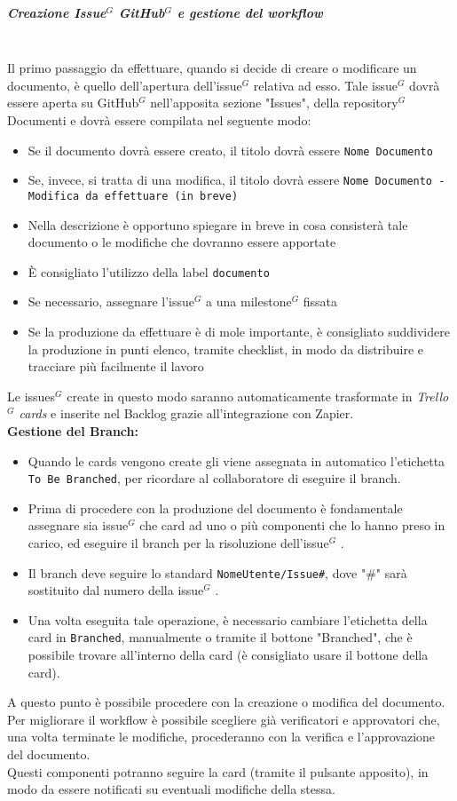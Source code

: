 \subparagraph{Creazione Issue$^G$  GitHub$^G$  e gestione del workflow}
\mbox{}\\
Il primo passaggio da effettuare, quando si decide di creare o modificare un documento, è quello dell'apertura dell'issue$^G$  relativa ad esso.
Tale issue$^G$ dovrà essere aperta su GitHub$^G$  nell'apposita sezione "Issues", della repository$^G$  Documenti e dovrà essere compilata nel seguente modo:
\begin{itemize}
    \item Se il documento dovrà essere creato, il titolo dovrà essere
    \texttt{Nome Documento}
    \item Se, invece, si tratta di una modifica, il titolo dovrà essere
    \texttt{Nome Documento - Modifica da effettuare (in breve)}
    \item Nella descrizione è opportuno spiegare in breve in cosa consisterà tale documento o le modifiche che dovranno essere apportate
    \item È consigliato l'utilizzo della label \texttt{documento}
    \item Se necessario, assegnare l'issue$^G$  a una milestone$^G$  fissata
    \item Se la produzione da effettuare è di mole importante, è consigliato suddividere la produzione in punti elenco, tramite checklist, in modo da distribuire e tracciare più facilmente il lavoro
\end{itemize}

\noindent Le issues$^G$  create in questo modo saranno automaticamente trasformate in \textit{Trello$^G$ cards} e inserite nel Backlog grazie all'integrazione con Zapier. \\

\noindent \textbf{Gestione del Branch:}
\begin{itemize}
    \item Quando le cards vengono create gli viene assegnata in automatico
    l'etichetta \texttt{To Be Branched}, per ricordare al collaboratore di
    eseguire il branch.
    \item Prima di procedere con la produzione del documento è fondamentale
    assegnare sia issue$^G$  che card ad uno o più componenti che lo hanno preso in carico,
    ed eseguire il branch per la risoluzione dell'issue$^G$ .
    \item Il branch deve seguire lo standard \texttt{NomeUtente/Issue\#},
    dove "\#" sarà sostituito dal numero della issue$^G$ .
    \item Una volta eseguita tale operazione, è necessario cambiare l'etichetta
    della card in \texttt{Branched}, manualmente o tramite il
    bottone "Branched", che è possibile trovare all'interno della card (è consigliato usare il bottone della card).
\end{itemize}
\noindent A questo punto è possibile procedere con la creazione o modifica del documento.
Per migliorare il workflow è possibile scegliere già verificatori e
approvatori che, una volta terminate le modifiche, procederanno con la
verifica e l'approvazione del documento.\\
Questi componenti potranno seguire la card (tramite il pulsante apposito),
in modo da essere notificati su eventuali modifiche della stessa.

